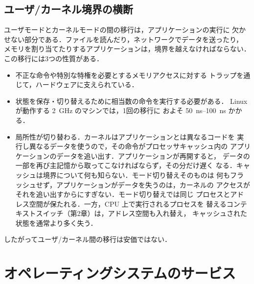 \documentclass[../main.tex]{subfiles}
\begin{document}
\subsection{ユーザ/カーネル境界の横断}

ユーザモードとカーネルモードの間の移行は，アプリケーションの実行に
欠かせない部分である．ファイルを読んだり，ネットワークでデータを送ったり，
メモリを割り当てたりするアプリケーションは，境界を越えなければならない．
この移行には3つの性質がある．
\begin{itemize}
  \item 不正な命令や特別な特権を必要とするメモリアクセスに対する
    トラップを通じて，ハードウェアに支えられている．
  \item 状態を保存・切り替えるために相当数の命令を実行する必要がある．
    Linux が動作する \SI{2}{\giga\hertz} のマシンでは，1回の移行に
    およそ \SIrange[range-phrase={--},range-units=single]{50}{100}{\nano\second}
    かかる．
  \item 局所性が切り替わる．カーネルはアプリケーションとは異なるコードを
    実行し異なるデータを使うので，その命令がプロセッサキャッシュ内の
    アプリケーションのデータを追い出す．アプリケーションが再開すると，
    データの一部を再び主記憶から取ってこなければならず，その分だけ遅く
    なる．キャッシュは境界について何も知らない．モード切り替えそのものは
    何もフラッシュせず，アプリケーションがデータを失うのは，カーネルの
    アクセスがそれを追い出すからにすぎない．モード切り替えでは同じ
    プロセスとアドレス空間が保たれる．一方，CPU 上で実行されるプロセスを
    替えるコンテキストスイッチ（第2章）は，アドレス空間も入れ替え，
    キャッシュされた状態を通常より多く失う．
\end{itemize}
したがってユーザ/カーネル間の移行は安価ではない．

\section{オペレーティングシステムのサービス}
\label{sec:l01-services}
\end{document}
